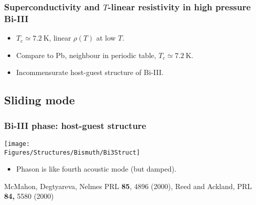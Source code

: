 \begin{frame}[label=BiSuper1]
\frametitle{Superconductivity and $T$-linear resistivity in high pressure Bi-III}
\centerline{}

\begin{itemize}
\item $T_c \simeq 7.2 ~ \text{K}$, linear $\rho(T)$ at low $T$.
\item Compare to Pb, neighbour in periodic table, $T_c \simeq 7.2~\text{K}$.
\item<visible@2-> Incommensurate host-guest structure of Bi-III.

\end{itemize}

\vspace*{\fill}
\centerline{\makebox[\linewidth]{\rule{0.85\textwidth}{0.4pt}}}
\centerline{}
\end{frame}

\subsection{Sliding mode}
\begin{frame}[label=BiIntro]
\frametitle{Bi-III phase: host-guest structure}
\centerline{\texttt{[image: \\Figures/Structures/Bismuth/Bi3Struct]}}


\begin{itemize}
\item <visible@2->Phason is like fourth acoustic mode (but damped).

\end{itemize}

\vspace*{\fill}
\vspace{1.5em}
\centerline{\makebox[\linewidth]{\rule{0.85\textwidth}{0.4pt}}}
\centerline{\scriptsize McMahon, Degtyareva, Nelmes PRL {\bf 85}, 4896
  (2000), Reed and Ackland, PRL {\bf 84,} 5580 (2000)}
\end{frame}

